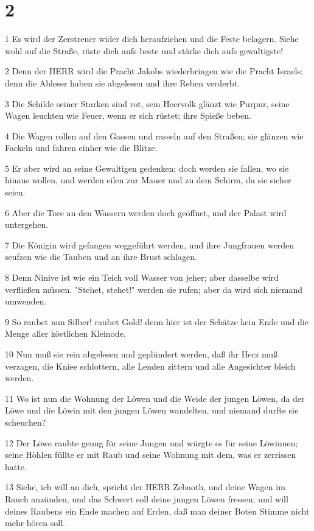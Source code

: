 \chapter{2}

\par 1 Es wird der Zerstreuer wider dich heraufziehen und die Feste belagern. Siehe wohl auf die Straße, rüste dich aufs beste und stärke dich aufs gewaltigste!
\par 2 Denn der HERR wird die Pracht Jakobs wiederbringen wie die Pracht Israels; denn die Ableser haben sie abgelesen und ihre Reben verderbt.
\par 3 Die Schilde seiner Starken sind rot, sein Heervolk glänzt wie Purpur, seine Wagen leuchten wie Feuer, wenn er sich rüstet; ihre Spieße beben.
\par 4 Die Wagen rollen auf den Gassen und rasseln auf den Straßen; sie glänzen wie Fackeln und fahren einher wie die Blitze.
\par 5 Er aber wird an seine Gewaltigen gedenken; doch werden sie fallen, wo sie hinaus wollen, und werden eilen zur Mauer und zu dem Schirm, da sie sicher seien.
\par 6 Aber die Tore an den Wassern werden doch geöffnet, und der Palast wird untergehen.
\par 7 Die Königin wird gefangen weggeführt werden, und ihre Jungfrauen werden seufzen wie die Tauben und an ihre Brust schlagen.
\par 8 Denn Ninive ist wie ein Teich voll Wasser von jeher; aber dasselbe wird verfließen müssen. "Stehet, stehet!" werden sie rufen; aber da wird sich niemand umwenden.
\par 9 So raubet nun Silber! raubet Gold! denn hier ist der Schätze kein Ende und die Menge aller köstlichen Kleinode.
\par 10 Nun muß sie rein abgelesen und geplündert werden, daß ihr Herz muß verzagen, die Kniee schlottern, alle Lenden zittern und alle Angesichter bleich werden.
\par 11 Wo ist nun die Wohnung der Löwen und die Weide der jungen Löwen, da der Löwe und die Löwin mit den jungen Löwen wandelten, und niemand durfte sie scheuchen?
\par 12 Der Löwe raubte genug für seine Jungen und würgte es für seine Löwinnen; seine Höhlen füllte er mit Raub und seine Wohnung mit dem, was er zerrissen hatte.
\par 13 Siehe, ich will an dich, spricht der HERR Zebaoth, und deine Wagen im Rauch anzünden, und das Schwert soll deine jungen Löwen fressen; und will deines Raubens ein Ende machen auf Erden, daß man deiner Boten Stimme nicht mehr hören soll.

